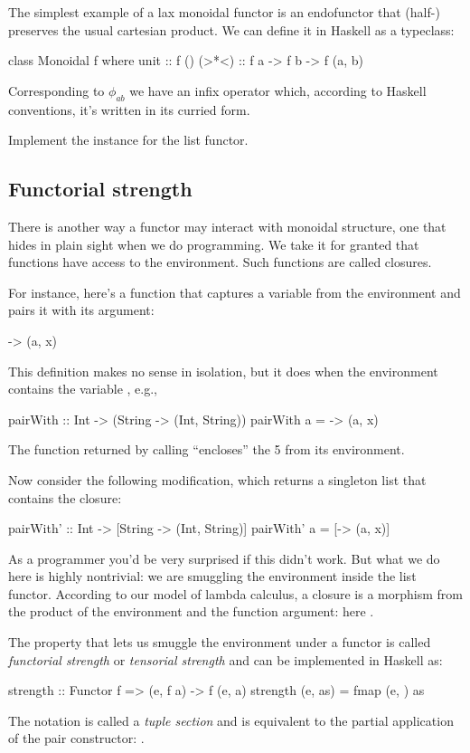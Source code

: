 \documentclass[DaoFP]{subfiles}
\begin{document}
The simplest example of a lax monoidal functor is an endofunctor that (half-) preserves the usual cartesian product. We can define it in Haskell as a typeclass:

\begin{haskell}
class Monoidal f where
  unit  :: f ()
  (>*<) :: f a -> f b -> f (a, b)
\end{haskell}
Corresponding to $\phi_{a b}$ we have an infix operator which, according to Haskell conventions, it's written in its curried form.

\begin{exercise}
Implement the  instance for the list functor.
\end{exercise}

\subsection{Functorial strength}

There is another way a functor may interact with monoidal structure, one that hides in plain sight when we do programming. We take it for granted that functions have access to the environment. Such functions are called closures. 

For instance, here's a function that captures a variable  from the environment and pairs it with its argument:
\begin{haskell}
\x -> (a, x)
\end{haskell}
This definition makes no sense in isolation, but it does when the environment contains the variable , e.g.,
\begin{haskell}
pairWith :: Int -> (String -> (Int, String))
pairWith a = \x -> (a, x)
\end{haskell}
The function returned by calling  ``encloses'' the 5 from its environment.

Now consider the following modification, which returns a singleton list that contains the closure:
\begin{haskell}
pairWith' :: Int -> [String -> (Int, String)]
pairWith' a = [\x -> (a, x)]
\end{haskell}
As a programmer you'd be very surprised if this didn't work. But what we do here is highly nontrivial: we are smuggling the environment inside the list functor. According to our model of lambda calculus, a closure is a morphism from the product of the environment and the function argument: here . 

The property that lets us smuggle the environment under a functor is called \emph{functorial strength} or \emph{tensorial strength} and can be implemented in Haskell as:
\begin{haskell}
strength :: Functor f => (e, f a) -> f (e, a)
strength (e, as) = fmap (e, ) as
\end{haskell}
The notation  is called a \emph{tuple section} and is equivalent to the partial application of the pair constructor: .
\end{document}
